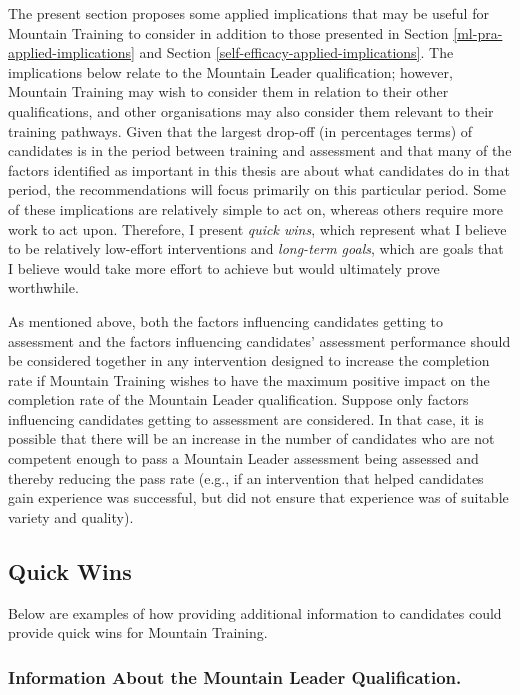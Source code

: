 \documentclass[
  12pt,
  a4paper,
]{book}
\begin{document}
The present section proposes some applied implications that may be useful for Mountain Training to consider in addition to those presented in Section \ref{ml-pra-applied-implications} and Section \ref{self-efficacy-applied-implications}. The implications below relate to the Mountain Leader qualification; however, Mountain Training may wish to consider them in relation to their other qualifications, and other organisations may also consider them relevant to their training pathways. Given that the largest drop-off (in percentages terms) of candidates is in the period between training and assessment and that many of the factors identified as important in this thesis are about what candidates do in that period, the recommendations will focus primarily on this particular period. Some of these implications are relatively simple to act on, whereas others require more work to act upon. Therefore, I present \emph{quick wins}, which represent what I believe to be relatively low-effort interventions and \emph{long-term goals}, which are goals that I believe would take more effort to achieve but would ultimately prove worthwhile.

As mentioned above, both the factors influencing candidates getting to assessment and the factors influencing candidates' assessment performance should be considered together in any intervention designed to increase the completion rate if Mountain Training wishes to have the maximum positive impact on the completion rate of the Mountain Leader qualification. Suppose only factors influencing candidates getting to assessment are considered. In that case, it is possible that there will be an increase in the number of candidates who are not competent enough to pass a Mountain Leader assessment being assessed and thereby reducing the pass rate (e.g., if an intervention that helped candidates gain experience was successful, but did not ensure that experience was of suitable variety and quality).

\hypertarget{quick-wins}{%
\subsection{Quick Wins}\label{quick-wins}}

Below are examples of how providing additional information to candidates could provide quick wins for Mountain Training.

\hypertarget{information-about-the-mountain-leader-qualification.}{%
\subsubsection{Information About the Mountain Leader Qualification.}\label{information-about-the-mountain-leader-qualification.}}
\end{document}
